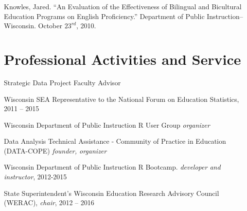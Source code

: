 \documentclass[margin,line]{res}
\begin{document}
\begin{resume}
Knowles, Jared. ``An Evaluation of the Effectiveness of Bilingual and Bicultural Education Programs on English Proficiency.'' Department of Public Instruction--Wisconsin. October $23^{rd}$, 2010. 

\section{\sc Professional Activities and Service}

Strategic Data Project Faculty Advisor

Wisconsin SEA Representative to the National Forum on Education Statistics, 2011 -- 
2015

Wisconsin Department of Public Instruction R User Group \emph{organizer}

Data Analysis Technical Assistance - Community of Practice in Education (DATA-COPE) \emph{founder, organizer} 

Wisconsin Department of Public Instruction R Bootcamp. \emph{developer and instructor}, 
2012-2015

State Superintendent's Wisconsin Education Research Advisory Council (WERAC), 
\emph{chair}, 2012 -- 2016


% 



% 







\end{resume}
\end{document}
